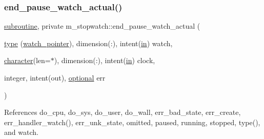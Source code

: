 \subsubsection{\texorpdfstring{end\+\_\+pause\+\_\+watch\+\_\+actual()}{end\_pause\_watch\_actual()}}
{\footnotesize\ttfamily \hyperlink{M__stopwatch_83_8txt_acfbcff50169d691ff02d4a123ed70482}{subroutine}, private m\+\_\+stopwatch\+::end\+\_\+pause\+\_\+watch\+\_\+actual (\begin{DoxyParamCaption}\item[{\hyperlink{stop__watch_83_8txt_a70f0ead91c32e25323c03265aa302c1c}{type} (\hyperlink{structm__stopwatch_1_1watch__pointer}{watch\+\_\+pointer}), dimension(\+:), intent(\hyperlink{M__journal_83_8txt_afce72651d1eed785a2132bee863b2f38}{in})}]{watch,  }\item[{\hyperlink{option__stopwatch_83_8txt_abd4b21fbbd175834027b5224bfe97e66}{character}(len=$\ast$), dimension(\+:), intent(\hyperlink{M__journal_83_8txt_afce72651d1eed785a2132bee863b2f38}{in})}]{clock,  }\item[{integer, intent(out), \hyperlink{option__stopwatch_83_8txt_aa4ece75e7acf58a4843f70fe18c3ade5}{optional}}]{err }\end{DoxyParamCaption})\hspace{0.3cm}{\ttfamily [private]}}



References do\+\_\+cpu, do\+\_\+sys, do\+\_\+user, do\+\_\+wall, err\+\_\+bad\+\_\+state, err\+\_\+create, err\+\_\+handler\+\_\+watch(), err\+\_\+unk\+\_\+state, omitted, paused, running, stopped, type(), and watch.

\mbox{\label{namespacem__stopwatch_abf357521b2751b550b6097542dadf213}} 
